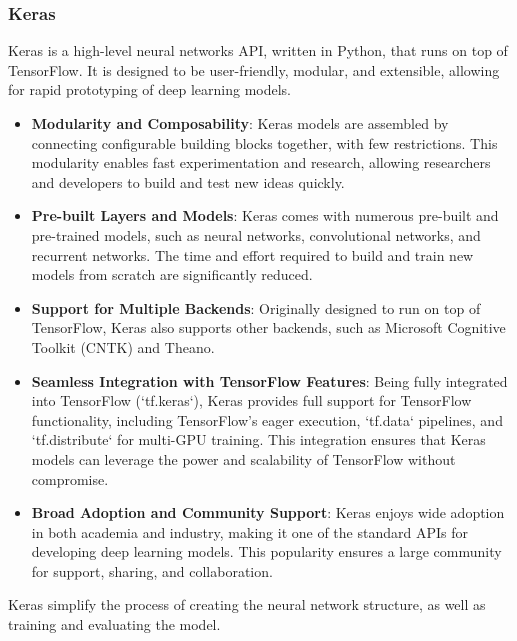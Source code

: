 \subsubsection{Keras}
Keras is a high-level neural networks API, written in Python, that runs on top of TensorFlow. It is designed to be user-friendly, modular, and extensible, allowing
for rapid prototyping of deep learning models.\cite{keras}

\begin{itemize}
    \item \textbf{Modularity and Composability}: Keras models are assembled by connecting configurable building blocks together, with few restrictions. 
    This modularity enables fast experimentation and research, allowing researchers and developers to build and test new ideas quickly.

    \item \textbf{Pre-built Layers and Models}: Keras comes with numerous pre-built and pre-trained models, such as neural networks, convolutional networks,
    and recurrent networks. The time and effort required to build and train new models from scratch are significantly reduced.

    \item \textbf{Support for Multiple Backends}: Originally designed to run on top of TensorFlow, Keras also supports other backends, such as Microsoft 
    Cognitive Toolkit (CNTK) and Theano. 

    \item \textbf{Seamless Integration with TensorFlow Features}: Being fully integrated into TensorFlow (`tf.keras`), Keras provides full support for 
    TensorFlow functionality, including TensorFlow's eager execution, `tf.data` pipelines, and `tf.distribute` for multi-GPU training. This integration ensures 
    that Keras models can leverage the power and scalability of TensorFlow without compromise.

    \item \textbf{Broad Adoption and Community Support}: Keras enjoys wide adoption in both academia and industry, making it one of the standard APIs for 
    developing deep learning models. This popularity ensures a large community for support, sharing, and collaboration.

\end{itemize}

Keras simplify the process of creating the neural network structure, as well as training and evaluating the model. 

